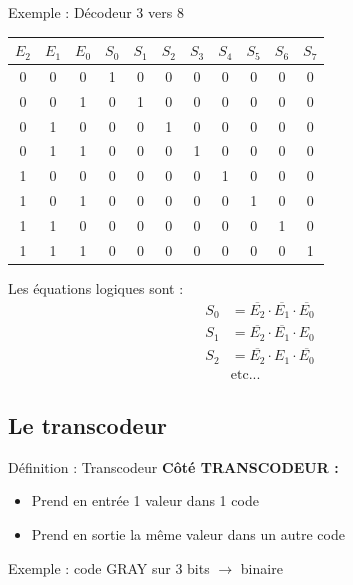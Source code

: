 \documentclass[a4paper,12pt]{article}
\begin{document}
\begin{examplebox}{Exemple : Décodeur 3 vers 8}
\begin{center}
\begin{tabular}{|ccc|cccccccc|}
\hline
$E_2$ & $E_1$ & $E_0$ & $S_0$ & $S_1$ & $S_2$ & $S_3$ & $S_4$ & $S_5$ & $S_6$ & $S_7$ \\
\hline
0 & 0 & 0 & 1 & 0 & 0 & 0 & 0 & 0 & 0 & 0 \\
0 & 0 & 1 & 0 & 1 & 0 & 0 & 0 & 0 & 0 & 0 \\
0 & 1 & 0 & 0 & 0 & 1 & 0 & 0 & 0 & 0 & 0 \\
0 & 1 & 1 & 0 & 0 & 0 & 1 & 0 & 0 & 0 & 0 \\
1 & 0 & 0 & 0 & 0 & 0 & 0 & 1 & 0 & 0 & 0 \\
1 & 0 & 1 & 0 & 0 & 0 & 0 & 0 & 1 & 0 & 0 \\
1 & 1 & 0 & 0 & 0 & 0 & 0 & 0 & 0 & 1 & 0 \\
1 & 1 & 1 & 0 & 0 & 0 & 0 & 0 & 0 & 0 & 1 \\
\hline
\end{tabular}
\end{center}

Les équations logiques sont :
\begin{align*}
S_0 &= \overline{E_2} \cdot \overline{E_1} \cdot \overline{E_0} \\
S_1 &= \overline{E_2} \cdot \overline{E_1} \cdot E_0 \\
S_2 &= \overline{E_2} \cdot E_1 \cdot \overline{E_0} \\
&\text{etc...}
\end{align*}
\end{examplebox}

\subsection{Le transcodeur}

\begin{defbox}{Définition : Transcodeur}
\textbf{Côté TRANSCODEUR :}
\begin{itemize}
    \item Prend en entrée 1 valeur dans 1 code
    \item Prend en sortie la même valeur dans un autre code
\end{itemize}

Exemple : code GRAY sur 3 bits $\rightarrow$ binaire
\end{defbox}
\end{document}
